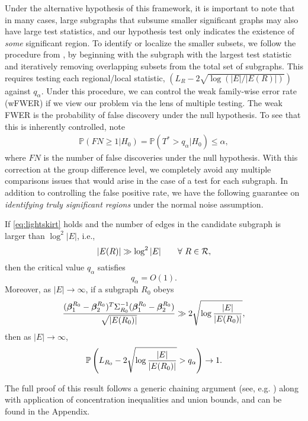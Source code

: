 Under the alternative hypothesis of this framework, it is important to note that in many cases,
large subgraphs that subsume smaller significant graphs may also have large test statistics, and our hypothesis test only indicates the existence of {\em some} significant region. To identify or localize the smaller subsets, we follow the procedure from \cite{jeng2010optimal}, by beginning with the subgraph with the largest test statistic and iteratively removing overlapping subsets from the total set of subgraphs. This requires testing each regional/local statistic, $(L_R - 2\sqrt{\log(|E|/|E(R)|)})$ against $q_\alpha$. Under this procedure, we can control the weak family-wise error rate (wFWER) if we view our problem via the lens of multiple testing. The weak FWER is the probability of false discovery under the null hypothesis. To see that this is inherently controlled, note
\begin{align}
\mathbb{P}(FN \geq 1|H_0) = \mathbb{P}(T^* > q_\alpha|H_0) \leq \alpha, 
\end{align}
where $FN$ is the number of false discoveries under the null hypothesis. With this correction at the group difference level, we completely avoid any multiple comparisons issues that would arise in the case of a test for each subgraph.
%
In addition to controlling the false positive rate, we have the following guarantee on {\em identifying truly significant regions} under the normal noise assumption.
\begin{theorem}
If \eqref{eq:lightskirt} holds and the number of edges in the candidate subgraph is larger than $\log^2 |E|$, i.e.,
\begin{equation}
\label{eq:setsize}
|E(R)|\gg \log^2 |E|\qquad \forall\ R\in\mathcal{R},
\end{equation}
then the critical value $q_\alpha$ satisfies
\begin{equation}
\label{eq:criticalvl}
q_\alpha=O(1).
\end{equation}
Moreover, as $|E|\to \infty$, if a subgraph $R_0$ obeys 
\begin{equation}
\label{eq:sigcond}
\frac{(\bm{\beta}_1^{R_0}-\bm{\beta}_2^{R_0})^T\Sigma_{R_0}^{-1}(\bm{\beta}_1^{R_0}-\bm{\beta}_2^{R_0})}{\sqrt{|E({R_0})|}}\gg 2\sqrt{\log\frac{|E|}{|E({R_0})|}},
\end{equation}
then as $|E|\to \infty$,
\begin{equation}
\label{eq:power}
\mathbb{P}\left(L_{R_0}-2\sqrt{\log\frac{|E|}{|E({R_0})|}}>q_\alpha\right)\to 1.
\end{equation}
\label{lm:mainthm}
\end{theorem}
The full proof of this result follows a generic chaining argument (see, e.g. \cite{talagrand2006generic}) along with application of 
concentration inequalities and union bounds, and can be found in the Appendix.


